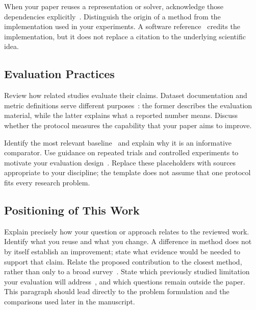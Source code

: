 When your paper reuses a representation or solver, acknowledge those
dependencies explicitly~\cite{representation,optimization}. Distinguish the
origin of a method from the implementation used in your experiments. A
software reference~\cite{software} credits the implementation, but it does
not replace a citation to the underlying scientific idea.

\subsection{Evaluation Practices}
Review how related studies evaluate their claims. Dataset documentation
and metric definitions serve different purposes~\cite{dataset,metric}:
the former describes the evaluation material, while the latter explains
what a reported number means. Discuss whether the protocol measures the
capability that your paper aims to improve.

Identify the most relevant baseline~\cite{baseline} and explain why it is
an informative comparator. Use guidance on repeated trials and controlled
experiments to motivate your evaluation design~\cite{reproducibility,ablation}.
Replace these placeholders with sources appropriate to your discipline;
the template does not assume that one protocol fits every research problem.

\subsection{Positioning of This Work}
Explain precisely how your question or approach relates to the reviewed
work. Identify what you reuse and what you change. A difference in method
does not by itself establish an improvement; state what evidence would
be needed to support that claim.
Relate the proposed contribution to the closest method, rather than only
to a broad survey~\cite{hybrid}. State which previously studied limitation
your evaluation will address~\cite{limitations}, and which questions remain
outside the paper. This paragraph should lead directly to the problem
formulation and the comparisons used later in the manuscript.
